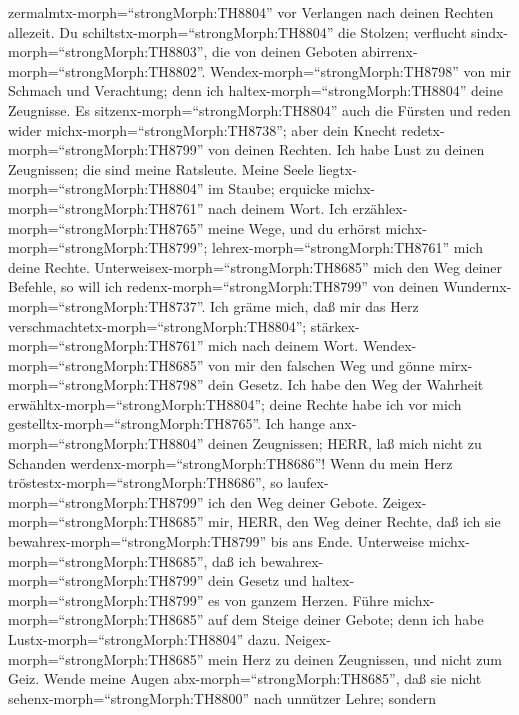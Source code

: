 zermalmtx-morph=``strongMorph:TH8804'' vor Verlangen nach deinen Rechten
allezeit.  Du schiltstx-morph=``strongMorph:TH8804'' die
Stolzen; verflucht sindx-morph=``strongMorph:TH8803'', die von deinen
Geboten abirrenx-morph=``strongMorph:TH8802''. 
Wendex-morph=``strongMorph:TH8798'' von mir Schmach und Verachtung; denn
ich haltex-morph=``strongMorph:TH8804'' deine Zeugnisse. 
Es sitzenx-morph=``strongMorph:TH8804'' auch die Fürsten und reden wider
michx-morph=``strongMorph:TH8738''; aber dein Knecht
redetx-morph=``strongMorph:TH8799'' von deinen Rechten. 
Ich habe Lust zu deinen Zeugnissen; die sind meine Ratsleute.
 Meine Seele liegtx-morph=``strongMorph:TH8804'' im Staube;
erquicke michx-morph=``strongMorph:TH8761'' nach deinem Wort.
 Ich erzählex-morph=``strongMorph:TH8765'' meine Wege, und
du erhörst michx-morph=``strongMorph:TH8799'';
lehrex-morph=``strongMorph:TH8761'' mich deine Rechte. 
Unterweisex-morph=``strongMorph:TH8685'' mich den Weg deiner Befehle, so
will ich redenx-morph=``strongMorph:TH8799'' von deinen
Wundernx-morph=``strongMorph:TH8737''.  Ich gräme mich, daß
mir das Herz verschmachtetx-morph=``strongMorph:TH8804'';
stärkex-morph=``strongMorph:TH8761'' mich nach deinem Wort.
 Wendex-morph=``strongMorph:TH8685'' von mir den falschen
Weg und gönne mirx-morph=``strongMorph:TH8798'' dein Gesetz.
 Ich habe den Weg der Wahrheit
erwähltx-morph=``strongMorph:TH8804''; deine Rechte habe ich vor mich
gestelltx-morph=``strongMorph:TH8765''.  Ich hange
anx-morph=``strongMorph:TH8804'' deinen Zeugnissen; HERR, laß mich nicht
zu Schanden werdenx-morph=``strongMorph:TH8686''!  Wenn du
mein Herz tröstestx-morph=``strongMorph:TH8686'', so
laufex-morph=``strongMorph:TH8799'' ich den Weg deiner Gebote.
 Zeigex-morph=``strongMorph:TH8685'' mir, HERR, den Weg
deiner Rechte, daß ich sie bewahrex-morph=``strongMorph:TH8799'' bis ans
Ende.  Unterweise michx-morph=``strongMorph:TH8685'', daß
ich bewahrex-morph=``strongMorph:TH8799'' dein Gesetz und
haltex-morph=``strongMorph:TH8799'' es von ganzem Herzen. 
Führe michx-morph=``strongMorph:TH8685'' auf dem Steige deiner Gebote;
denn ich habe Lustx-morph=``strongMorph:TH8804'' dazu. 
Neigex-morph=``strongMorph:TH8685'' mein Herz zu deinen Zeugnissen, und
nicht zum Geiz.  Wende meine Augen
abx-morph=``strongMorph:TH8685'', daß sie nicht
sehenx-morph=``strongMorph:TH8800'' nach unnützer Lehre; sondern
